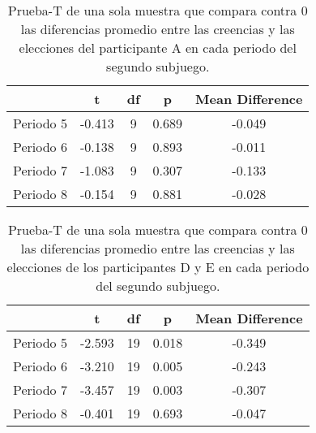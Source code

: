 \begin{table}
\caption[Diferencias Normalizadas en el Subjuego 2, Participante A]{Prueba-T de una sola muestra que compara contra 0 las diferencias promedio entre las creencias y las elecciones del participante A en cada periodo del segundo subjuego.}
\label{DN_Sub1}
\centering
\begin{tabular}{l | c c c c}  %
\toprule
\textbf{} & \textbf{t} & \textbf{df} & \textbf{p} & \textbf{Mean Difference}\\
\midrule
Periodo 5 & -0.413 & 9 & 0.689 & -0.049 \\
Periodo 6 & -0.138 & 9 & 0.893 & -0.011 \\
Periodo 7 & -1.083 & 9 & 0.307 & -0.133 \\
Periodo 8 & -0.154 & 9 & 0.881 & -0.028 \\
\bottomrule
\end{tabular}
\end{table}

\begin{table}
\caption[Diferencias Normalizadas en el Subjuego 2, Participantes D y E]{Prueba-T de una sola muestra que compara contra 0 las diferencias promedio entre las creencias y las elecciones de los participantes D y E en cada periodo del segundo subjuego.}
\label{DN_Sub1}
\centering
\begin{tabular}{l | c c c c}  %
\toprule
\textbf{} & \textbf{t} & \textbf{df} & \textbf{p} & \textbf{Mean Difference}\\
\midrule
Periodo 5 & -2.593 & 19 & 0.018 & -0.349 \\
Periodo 6 & -3.210 & 19 & 0.005 & -0.243 \\
Periodo 7 & -3.457 & 19 & 0.003 & -0.307 \\
Periodo 8 & -0.401 & 19 & 0.693 & -0.047 \\
\bottomrule
\end{tabular}
\end{table}

